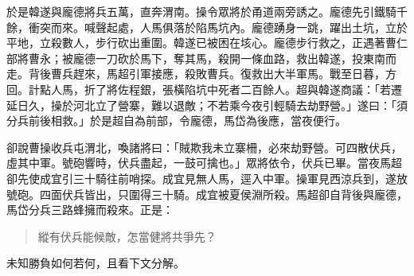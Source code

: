 於是韓遂與龐德將兵五萬，直奔渭南。操令眾將於甬道兩旁誘之。龐德先引鐵騎千餘，衝突而來。喊聲起處，人馬俱落於陷馬坑內。龐德踴身一跳，躍出土坑，立於平地，立殺數人，步行砍出重圍。韓遂已被困在垓心。龐德步行救之，正遇著曹仁部將曹永；被龐德一刀砍於馬下，奪其馬，殺開一條血路，救出韓遂，投東南而走。背後曹兵趕來，馬超引軍接應，殺敗曹兵。復救出大半軍馬。戰至日暮，方回。計點人馬，折了將佐程銀，張橫陷坑中死者二百餘人。超與韓遂商議：「若遷延日久，操於河北立了營寨，難以退敵；不若乘今夜引輕騎去劫野營。」遂曰：「須分兵前後相救。」於是超自為前部，令龐德，馬岱為後應，當夜便行。

卻說曹操收兵屯渭北，喚諸將曰：「賊欺我未立寨柵，必來劫野營。可四散伏兵，虛其中軍。號砲響時，伏兵盡起，一鼓可擒也。」眾將依令，伏兵已畢。當夜馬超卻先使成宜引三十騎往前哨探。成宜見無人馬，逕入中軍。操軍見西涼兵到，遂放號砲。四面伏兵皆出，只圍得三十騎。成宜被夏侯淵所殺。馬超卻自背後與龐德，馬岱分兵三路蜂擁而殺來。正是：

\begin{quote}
縱有伏兵能候敵，怎當健將共爭先？
\end{quote}

未知勝負如何若何，且看下文分解。
